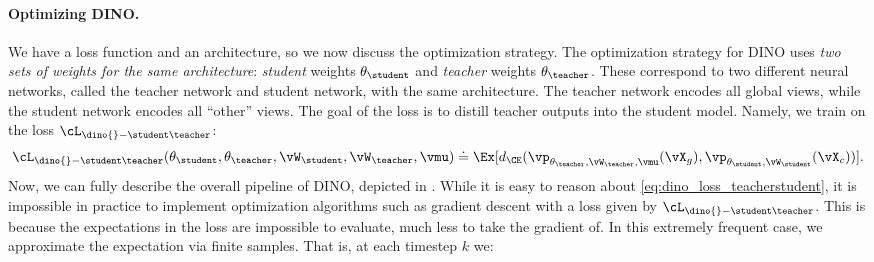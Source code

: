 \documentclass[../../book-main.tex]{subfiles}
\begin{document}
\paragraph{Optimizing DINO.} We have a loss function and an
architecture, so we now discuss the optimization strategy.
The
optimization strategy for DINO uses \textit{two sets of weights for
the same architecture}: \textit{student} weights
\(\theta_{\student}\) and \textit{teacher} weights
\(\theta_{\teacher}\).
These correspond to two different neural
networks, called the teacher network and student network, with the
same architecture.
The teacher network encodes all global views,
while the student network encodes all ``other'' views.
The goal of
the loss is to distill teacher outputs into the student model.
Namely, we train on the loss \(\cL_{\dino{}-\student\teacher}\):
\begin{equation}\label{eq:dino_loss_teacherstudent}
    \cL_{\dino{}-\student\teacher}(\theta_{\student},
    \theta_{\teacher}, \vW_{\student}, \vW_{\teacher}, \vmu) \doteq
    \Ex[d_{\CE}(\vp_{\theta_{\teacher}, \vW_{\teacher},
    \vmu}(\vX_{g}), \vp_{\theta_{\student}, \vW_{\student}}(\vX_{c}))] .
\end{equation}
Now, we can fully describe the overall pipeline of DINO, depicted in
.
While it is easy to reason about \eqref{eq:dino_loss_teacherstudent},
it is impossible in practice to implement optimization algorithms
such as gradient descent with a loss given by
\(\cL_{\dino{}-\student\teacher}\).
This is because the expectations
in the loss are impossible to evaluate, much less to take the
gradient of.
In this extremely frequent case, we approximate the
expectation via finite samples.
That is, at each timestep \(k\) we:
\end{document}

